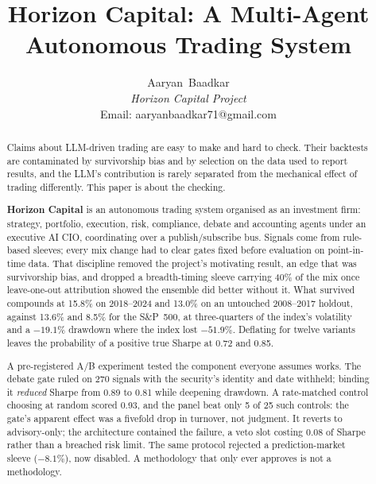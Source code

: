 \documentclass[10pt,twocolumn]{IEEEtran}
\begin{document}
\title{Horizon Capital: A Multi-Agent Autonomous Trading System}

\author{Aaryan~Baadkar\\
\textit{Horizon Capital Project}\\
Email: aaryanbaadkar71@gmail.com}

\maketitle

\begin{abstract}
Claims about LLM-driven trading are easy to make and hard to check. Their
backtests are contaminated by survivorship bias and by selection on the data
used to report results, and the LLM's contribution is rarely separated from
the mechanical effect of trading differently. This paper is about the
checking.

\textbf{Horizon Capital} is an autonomous trading system organised as an
investment firm: strategy, portfolio, execution, risk, compliance, debate and
accounting agents under an executive AI CIO, coordinating over a
publish/subscribe bus. Signals come from rule-based sleeves; every mix change
had to clear gates fixed before evaluation on point-in-time data.
That discipline removed the project's motivating result, an edge that was
survivorship bias, and dropped a breadth-timing sleeve carrying
40\% of the mix once leave-one-out attribution showed the ensemble did better
without it. What survived compounds at 15.8\% on 2018--2024 and 13.0\% on an
untouched 2008--2017 holdout, against 13.6\% and 8.5\% for the S\&P~500, at
three-quarters of the index's volatility and a $-19.1\%$ drawdown where the
index lost $-51.9\%$. Deflating for twelve variants leaves the probability of
a positive true Sharpe at 0.72 and 0.85.

A pre-registered A/B experiment tested the component everyone assumes works. The debate gate ruled on 270 signals with the security's identity and
date withheld; binding it \emph{reduced} Sharpe from 0.89 to 0.81 while
deepening drawdown. A rate-matched control choosing at random scored 0.93, and
the panel beat only 5 of 25 such controls: the gate's apparent effect was a
fivefold drop in turnover, not judgment. It reverts to advisory-only; the
architecture contained the failure, a veto slot costing 0.08 of Sharpe rather
than a breached risk limit. The same protocol rejected a prediction-market
sleeve ($-8.1\%$), now disabled. A methodology that only ever approves is not
a methodology.
\end{abstract}
\end{document}
